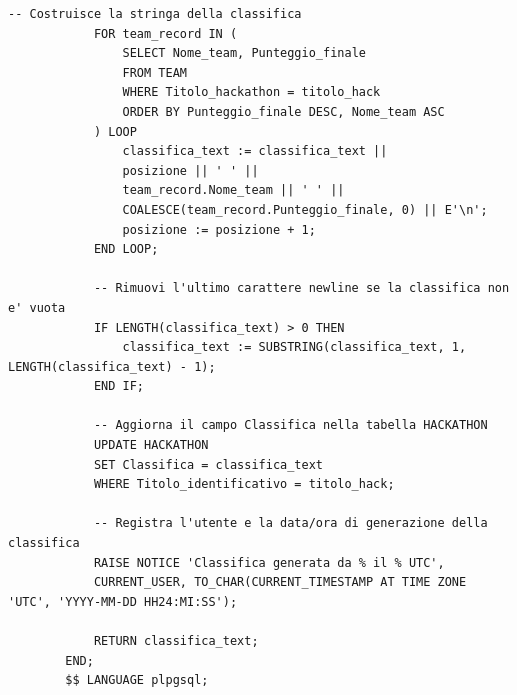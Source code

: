 \documentclass[a4paper, 10pt]{article}
\begin{document}
\begin{lstlisting}[style=sqlstyle]
			-- Costruisce la stringa della classifica
			FOR team_record IN (
				SELECT Nome_team, Punteggio_finale
				FROM TEAM
				WHERE Titolo_hackathon = titolo_hack
				ORDER BY Punteggio_finale DESC, Nome_team ASC
			) LOOP
				classifica_text := classifica_text || 
				posizione || ' ' || 
				team_record.Nome_team || ' ' || 
				COALESCE(team_record.Punteggio_finale, 0) || E'\n';
				posizione := posizione + 1;
			END LOOP;
			
			-- Rimuovi l'ultimo carattere newline se la classifica non e' vuota
			IF LENGTH(classifica_text) > 0 THEN
				classifica_text := SUBSTRING(classifica_text, 1, LENGTH(classifica_text) - 1);
			END IF;
			
			-- Aggiorna il campo Classifica nella tabella HACKATHON
			UPDATE HACKATHON
			SET Classifica = classifica_text
			WHERE Titolo_identificativo = titolo_hack;
			
			-- Registra l'utente e la data/ora di generazione della classifica
			RAISE NOTICE 'Classifica generata da % il % UTC', 
			CURRENT_USER, TO_CHAR(CURRENT_TIMESTAMP AT TIME ZONE 'UTC', 'YYYY-MM-DD HH24:MI:SS');
			
			RETURN classifica_text;
		END;
		$$ LANGUAGE plpgsql;
	\end{lstlisting}
\end{document}
